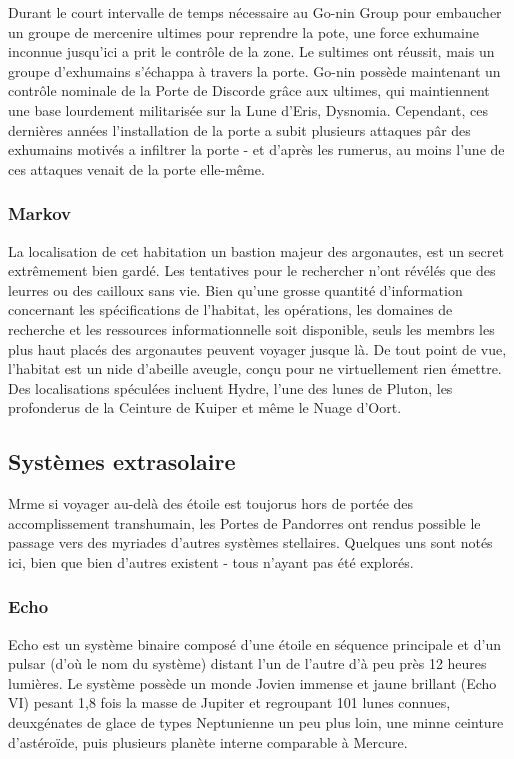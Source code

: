 Durant le court intervalle de temps nécessaire au Go-nin Group pour embaucher un groupe de mercenire ultimes pour reprendre la pote, une force exhumaine inconnue jusqu'ici a prit le contrôle de la zone. Le sultimes ont réussit, mais un groupe d'exhumains s'échappa à travers la porte. Go-nin possède maintenant un contrôle nominale de la Porte de Discorde grâce aux ultimes, qui maintiennent une base lourdement militarisée sur la Lune d'Eris, Dysnomia. Cependant, ces dernières années l'installation de la porte a subit plusieurs attaques pâr des exhumains motivés a infiltrer la porte - et d'après les rumerus, au moins l'une de ces attaques venait de la porte elle-même. 

\subsubsection{Markov} \label{sec:markov} 

La localisation de cet habitation un bastion majeur des argonautes, est un secret extrêmement bien gardé. Les tentatives pour le rechercher n'ont révélés que des leurres ou des cailloux sans vie. Bien qu'une grosse quantité d'information concernant les spécifications de l'habitat, les opérations, les domaines de recherche et les ressources informationnelle soit disponible, seuls les membrs les plus haut placés des argonautes peuvent voyager jusque là. De tout point de vue, l'habitat  est un nide d'abeille aveugle, conçu pour ne virtuellement rien émettre. Des localisations spéculées incluent Hydre, l'une des lunes de Pluton, les profonderus de la Ceinture de Kuiper et même le Nuage d'Oort. 

\subsection{Systèmes extrasolaire} \label{sec:extrasolar-systems} 

Mrme si voyager au-delà des étoile est toujorus hors de portée des accomplissement transhumain, les Portes de Pandorres ont rendus possible le passage vers des myriades d'autres systèmes stellaires. Quelques uns sont notés ici, bien que bien d'autres existent - tous n'ayant pas été explorés. 

\subsubsection{Echo} \label{sec:echo} 

Echo est un système binaire composé d'une étoile en séquence principale et d'un pulsar (d'où le nom du système) distant l'un de l'autre d'à peu près 12 heures lumières. Le système possède un monde Jovien immense et jaune brillant (Echo VI) pesant 1,8 fois la masse de Jupiter et regroupant 101 lunes connues, deuxgénates de glace de types Neptunienne un peu plus loin, une minne ceinture d'astéroïde, puis plusieurs planète interne comparable à Mercure. 





